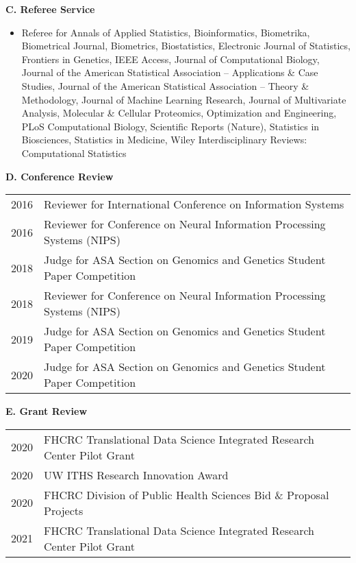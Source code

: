 \documentclass[10pt]{article}
\begin{document}
\textbf{C. Referee Service} 
\begin{itemize}
\item[] Referee for 
Annals of Applied Statistics,
Bioinformatics, 
Biometrika, 
Biometrical Journal, 
Biometrics, 
Biostatistics, 
Electronic Journal of Statistics, 
Frontiers in Genetics, 
IEEE Access, 
Journal of Computational Biology, 
Journal of the American Statistical Association -- Applications \& Case Studies, 
Journal of the American Statistical Association -- Theory \& Methodology, 
Journal of Machine Learning Research, 
Journal of Multivariate Analysis, 
Molecular \& Cellular Proteomics, 
Optimization and Engineering, 
PLoS Computational Biology, 
Scientific Reports (Nature), 
Statistics in Biosciences, 
Statistics in Medicine,
Wiley Interdisciplinary Reviews: Computational Statistics 
\end{itemize}

\textbf{D. Conference Review}
\begin{table}[H]
\hskip0.9cm\begin{tabular}{p{1.6cm}p{12cm}}
2016 & Reviewer for  International Conference on Information Systems \\
2016 & Reviewer for  Conference on Neural Information Processing Systems (NIPS)\\
2018 & Judge for  ASA Section on Genomics and Genetics Student Paper Competition\\ 
2018 & Reviewer for  Conference on Neural Information Processing Systems (NIPS) \\
2019 & Judge for  ASA Section on Genomics and Genetics Student Paper Competition \\
2020 & Judge for  ASA Section on Genomics and Genetics Student Paper Competition \\
\end{tabular}
\end{table}

\textbf{E. Grant Review}
\begin{table}[H]
\hskip0.9cm\begin{tabular}{p{1.6cm}p{12cm}}
2020 & FHCRC Translational Data Science Integrated Research Center Pilot Grant \\
2020 & UW ITHS Research Innovation Award \\
2020 & FHCRC Division of Public Health Sciences Bid \& Proposal Projects\\
2021 & FHCRC Translational Data Science Integrated Research Center Pilot Grant
\end{tabular}
\end{table}
\end{document}
